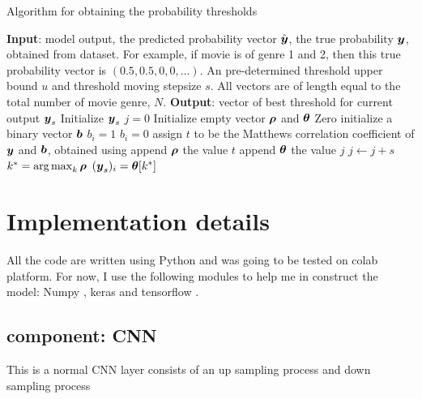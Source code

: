 \documentclass{article}
\begin{document}
\begin{algorithm}
    \caption{Algorithm for obtaining the probability thresholds}\label{alg:thres}
    \begin{algorithmic}
        \State \textbf{Input}: model output, the predicted probability vector \(\hat {\boldsymbol{y}}\), the true probability \(\boldsymbol{y}\), obtained from dataset. For example, if movie is of genre 1 and 2, then this true probability vector is \((0.5,0.5,0,0,\dots)\). An pre-determined threshold upper bound \(u\) and threshold moving stepsize \(s\). All vectors are of length equal to the total number of movie genre, \(N\).
        \State \textbf{Output}: vector of best threshold for current output \(\boldsymbol{y}_s\)
        \State Initialize \(\boldsymbol{y}_s\)
            \State \(j=0\)
            \State Initialize empty vector \(\boldsymbol{\rho}\) and \(\boldsymbol{\theta}\)
                \State Zero initialize a binary vector \(\boldsymbol{b}\)
                    \State \(b_i=1\)
                \Else
                    \State \(b_i=0\)
                \EndIf
                \State assign \(t\) to be the Matthews correlation coefficient of \(\boldsymbol{y}\) and \(\boldsymbol{b}\), obtained  using \cite{scikit-learn}
                \State append \(\boldsymbol{\rho}\) the value \(t\)
                \State append \(\boldsymbol{\theta}\) the value \(j\)
                \State \(j \gets j+s\)
            \EndFor
            \State \(k^* = \operatorname*{arg\,max}_k \boldsymbol{\rho}\)
            \State \((\boldsymbol{y}_s)_i=\boldsymbol{\theta}[k^*]\)
        \EndFor
    \end{algorithmic}
\end{algorithm}


\section{Implementation details}

All the code are written using Python \cite{10.5555/1593511} and was going to be tested on colab platform. For now, I use the following modules to help me in construct the model: Numpy \cite{harris2020array}, keras \cite{chollet2015keras} and tensorflow \cite{tensorflow2015-whitepaper}.

\subsection*{component: CNN}

This is a normal CNN layer consists of an up sampling process and down sampling process
\end{document}
